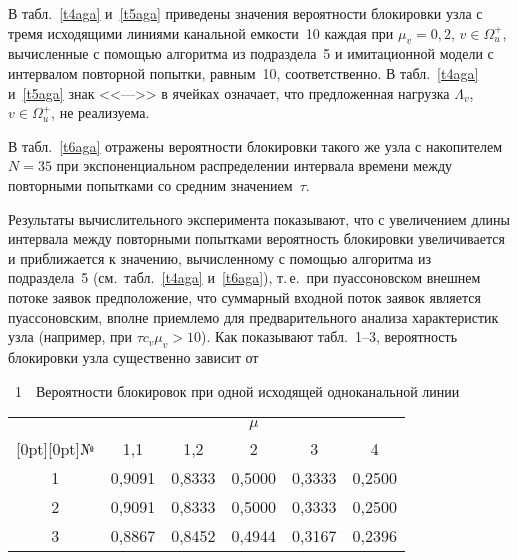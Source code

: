\begin{multicols}{2}
    В табл.~\ref{t4aga} и~\ref{t5aga} приведены значения вероятности 
блокировки узла с тремя исходящими линиями канальной емкости~10 каждая 
при $\mu_v =0{,}2$, $v\in\Omega_u^+$,  вычисленные с помощью алгоритма из 
подраздела~5 и имитационной модели с интервалом повторной попытки, 
равным~10, соответственно. В табл.~\ref{t4aga} и~\ref{t5aga} знак <<--->> в 
ячейках означает, что предложенная нагрузка $\Lambda_v$, $v\in\Omega_u^+$, 
не реализуема.



В табл.~\ref{t6aga} отражены вероятности блокировки такого же узла с 
накопителем $N = 35$ при экспоненциальном распределении интервала 
времени между повторными попытками со средним значением~$\tau$. 


Результаты вычислительного эксперимента показывают, что с  увеличением 
длины интервала между повторными попытками  вероятность блокировки 
увеличивается и приближается к значению,\linebreak
вычисленному с помощью 
алгоритма из подраздела~5 (см.\ табл.~\ref{t4aga} и~\ref{t6aga}), т.\,е.\ при 
пуассоновском внешнем потоке заявок предположение, что суммарный 
входной поток заявок  является пуассоновским, вполне приемлемо для 
предварительного анализа характеристик узла (например, при  $\tau c_v\mu_v > 
10$). Как показывают табл.~1--3, вероятность блокировки 
узла существенно зависит от\linebreak 

\vspace*{6pt}
\noindent
{\small
{{\tablename~1}\ \ \small{Вероятности блокировок при одной исходящей одноканальной линии}}
\vspace*{-3pt}

\begin{center}
{\tabcolsep=7.3pt
\begin{tabular}{|c|c|c|c|c|c|}
\hline
&\multicolumn{5}{c|}{$\mu$}\\
\cline{2-6}
\multicolumn{1}{|c|}{\raisebox{4pt}[0pt][0pt]{№}}&1{,}1&1{,}2&2&3&4\\
\hline
1&0,9091&0,8333&0,5000&0,3333&0,2500\\
2&0,9091&0,8333&0,5000&0,3333&0,2500\\
3&0,8867&0,8452&0,4944&0,3167&0,2396\\
\hline
\end{tabular}}
\end{center}
}
\addtocounter{table}{1}
\pagebreak

\end{multicols}


